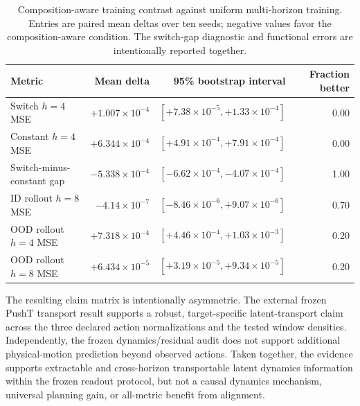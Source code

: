 \documentclass{article}
\begin{document}
\begin{table}[H]
\centering
\scriptsize
\setlength{\tabcolsep}{4pt}
\caption{Composition-aware training contrast against uniform multi-horizon
training. Entries are paired mean deltas over ten seeds; negative values favor
the composition-aware condition. The switch-gap diagnostic and functional
errors are intentionally reported together.}
\label{tab:supp-composition-aware}
\begin{tabular}{lrrr}
\toprule
Metric & Mean delta & 95\% bootstrap interval & Fraction better \\
\midrule
Switch $h=4$ MSE & $+1.007\times10^{-4}$ & $[+7.38\times10^{-5},+1.33\times10^{-4}]$ & 0.00 \\
Constant $h=4$ MSE & $+6.344\times10^{-4}$ & $[+4.91\times10^{-4},+7.91\times10^{-4}]$ & 0.00 \\
Switch-minus-constant gap & $-5.338\times10^{-4}$ & $[-6.62\times10^{-4},-4.07\times10^{-4}]$ & 1.00 \\
ID rollout $h=8$ MSE & $-4.14\times10^{-7}$ & $[-8.46\times10^{-6},+9.07\times10^{-6}]$ & 0.70 \\
OOD rollout $h=4$ MSE & $+7.318\times10^{-4}$ & $[+4.46\times10^{-4},+1.03\times10^{-3}]$ & 0.20 \\
OOD rollout $h=8$ MSE & $+6.434\times10^{-5}$ & $[+3.19\times10^{-5},+9.34\times10^{-5}]$ & 0.20 \\
\bottomrule
\end{tabular}
\end{table}

The resulting claim matrix is intentionally asymmetric. The external frozen
PushT transport result supports a robust, target-specific latent-transport
claim across the three declared action normalizations and the tested window
densities. Independently, the frozen dynamics/residual audit does not support
additional physical-motion prediction beyond observed actions. Taken together,
the evidence supports extractable and cross-horizon transportable latent
dynamics information within the frozen readout protocol, but not a causal
dynamics mechanism, universal planning gain, or all-metric benefit from
alignment.
\end{document}
